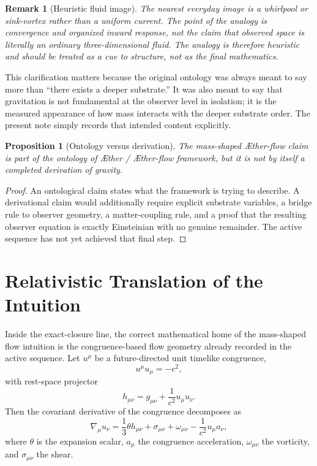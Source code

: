 \documentclass[11pt]{article}
\newcommand{\Aether}{\AE{}ther}
\newcommand{\Aflow}{\AE{}ther-flow}
\newcommand{\TheoryProgram}{\Aether{} / \Aflow{} framework}
\newtheorem{proposition}{Proposition}
\newtheorem{remark}{Remark}
\begin{document}
\begin{remark}[Heuristic fluid image]
The nearest everyday image is a whirlpool or sink-vortex rather than a uniform current. The point of the analogy is convergence and organized inward response, not the claim that observed space is literally an ordinary three-dimensional fluid. The analogy is therefore heuristic and should be treated as a cue to structure, not as the final mathematics.
\end{remark}

This clarification matters because the original ontology was always meant to say more than ``there exists a deeper substrate.'' It was also meant to say that gravitation is not fundamental at the observer level in isolation; it is the measured appearance of how mass interacts with the deeper substrate order. The present note simply records that intended content explicitly.

\begin{proposition}[Ontology versus derivation]
The mass-shaped \Aflow{} claim is part of the ontology of \TheoryProgram{}, but it is not by itself a completed derivation of gravity.
\end{proposition}

\begin{proof}
An ontological claim states what the framework is trying to describe. A derivational claim would additionally require explicit substrate variables, a bridge rule to observer geometry, a matter-coupling rule, and a proof that the resulting observer equation is exactly Einsteinian with no genuine remainder. The active sequence has not yet achieved that final step.
\end{proof}

\section{Relativistic Translation of the Intuition}

Inside the exact-closure line, the correct mathematical home of the mass-shaped flow intuition is the congruence-based flow geometry already recorded in the active sequence. Let \(u^\mu\) be a future-directed unit timelike congruence,
\begin{equation}
u^\mu u_\mu = -c^2,
\label{eq:unit}
\end{equation}
with rest-space projector
\begin{equation}
h_{\mu\nu}
=
g_{\mu\nu}+\frac{1}{c^2}u_\mu u_\nu.
\label{eq:projector}
\end{equation}
Then the covariant derivative of the congruence decomposes as
\begin{equation}
\nabla_\mu u_\nu
=
\frac13 \theta h_{\mu\nu}
+ \sigma_{\mu\nu}
+ \omega_{\mu\nu}
- \frac{1}{c^2}u_\mu a_\nu,
\label{eq:flowdecomp}
\end{equation}
where \(\theta\) is the expansion scalar, \(a_\mu\) the congruence acceleration, \(\omega_{\mu\nu}\) the vorticity, and \(\sigma_{\mu\nu}\) the shear.
\end{document}
